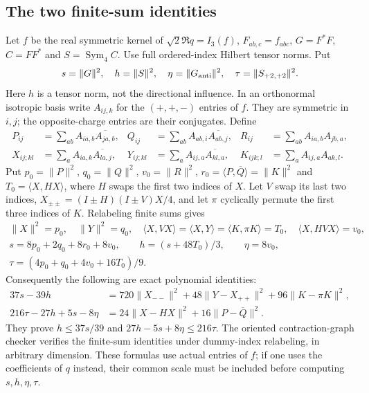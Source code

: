 \subsection{The two finite-sum identities}
Let $f$ be the real symmetric kernel of $\sqrt2\Re q=I_3(f)$,
$F_{ab,c}=f_{abc}$, $G=F^*F$, $C=FF^*$ and $S=\operatorname{Sym}_4 C$.
Use full ordered-index Hilbert tensor norms. Put
\[
 s=\|G\|^2,\quad h=\|S\|^2,\quad
 \eta=\|G_{\rm anti}\|^2,\quad \tau=\|S_{+2,+2}\|^2.
\]
Here $h$ is a tensor norm, not the directional influence.
In an orthonormal isotropic basis write $A_{ij,k}$ for the $(+,+,-)$
entries of $f$. They are symmetric in $i,j$; the opposite-charge
entries are their conjugates. Define
\[
\begin{aligned}
 P_{ij}&=\sum_{ab}A_{ia,b}\overline{A_{ja,b}},&
 Q_{ij}&=\sum_{ab}A_{ab,i}\overline{A_{ab,j}},&
 R_{ij}&=\sum_{ab}A_{ia,b}A_{jb,a},\\
 X_{ij;kl}&=\sum_a A_{ia,k}\overline{A_{la,j}},&
 Y_{ij;kl}&=\sum_a A_{ij,a}\overline{A_{kl,a}},&
 K_{ijk;l}&=\sum_a A_{ij,a}A_{ak,l}.
\end{aligned}
\]
Put $p_0=\|P\|^2$, $q_0=\|Q\|^2$, $v_0=\|R\|^2$,
$r_0=\langle P,\overline Q\rangle=\|K\|^2$ and
$T_0=\langle X,HX\rangle$, where $H$ swaps the first two indices of
$X$. Let $V$ swap its last two indices, $X_{\pm\pm}=(I\pm H)(I\pm V)X/4$,
and let $\pi$ cyclically permute the first three indices of $K$.
Relabeling finite sums gives
\[
\begin{gathered}
 \|X\|^2=p_0,\quad\|Y\|^2=q_0,\quad
 \langle X,VX\rangle=\langle X,Y\rangle
 =\langle K,\pi K\rangle=T_0,\quad
 \langle X,HVX\rangle=v_0,\\
 s=8p_0+2q_0+8r_0+8v_0,\qquad
 h=(s+48T_0)/3,\qquad \eta=8v_0,\\
 \tau=(4p_0+q_0+4v_0+16T_0)/9.
\end{gathered}
\]
Consequently the following are exact polynomial identities:
\begin{align}
37s-39h
 &=720\|X_{--}\|^2+48\|Y-X_{++}\|^2
                       +96\|K-\pi K\|^2,\label{eq:c6-sos-one}\\
216\tau-27h+5s-8\eta
 &=24\|X-HX\|^2+16\|P-\overline Q\|^2.
 \label{eq:c6-sos-two}
\end{align}
They prove $h\le37s/39$ and $27h-5s+8\eta\le216\tau$.
The oriented contraction-graph checker verifies the finite-sum
identities under dummy-index relabeling, in arbitrary dimension.
These formulas use actual entries of $f$; if one uses the coefficients
of $q$ instead, their common scale must be included before computing
$s,h,\eta,\tau$.

